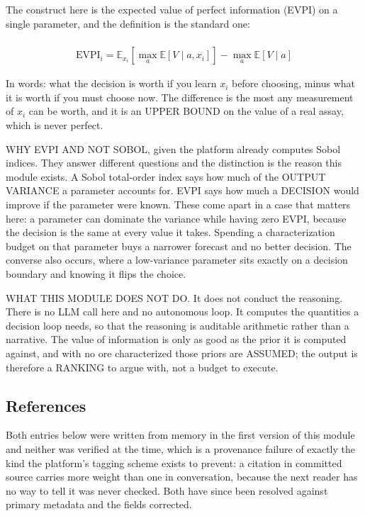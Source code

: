 \documentclass[10pt,a4paper,twoside]{report}
\begin{document}
The construct here is the expected value of perfect information (EVPI) on a single parameter, and the definition is the standard one:

\begin{equation*}
\begin{gathered}
\\ \mathrm{EVPI}_i = \mathbb{E}_{x_i}\!\left[\max_a \mathbb{E}[V \mid a, x_i]\right] - \max_a \mathbb{E}[V \mid a]
\end{gathered}
\end{equation*}

In words: what the decision is worth if you learn $x_i$ before choosing, minus what it is worth if you must choose now. The difference is the most any measurement of $x_i$ can be worth, and it is an UPPER BOUND on the value of a real assay, which is never perfect.

WHY EVPI AND NOT SOBOL, given the platform already computes Sobol indices. They answer different questions and the distinction is the reason this module exists. A Sobol total-order index says how much of the OUTPUT VARIANCE a parameter accounts for. EVPI says how much a DECISION would improve if the parameter were known. These come apart in a case that matters here: a parameter can dominate the variance while having zero EVPI, because the decision is the same at every value it takes. Spending a characterization budget on that parameter buys a narrower forecast and no better decision. The converse also occurs, where a low-variance parameter sits exactly on a decision boundary and knowing it flips the choice.

WHAT THIS MODULE DOES NOT DO. It does not conduct the reasoning. There is no LLM call here and no autonomous loop. It computes the quantities a decision loop needs, so that the reasoning is auditable arithmetic rather than a narrative. The value of information is only as good as the prior it is computed against, and with no ore characterized those priors are ASSUMED; the output is therefore a RANKING to argue with, not a budget to execute.

\subsection*{References}

Both entries below were written from memory in the first version of this module and neither was verified at the time, which is a provenance failure of exactly the kind the platform's tagging scheme exists to prevent: a citation in committed source carries more weight than one in conversation, because the next reader has no way to tell it was never checked. Both have since been resolved against primary metadata and the fields corrected.
\end{document}
